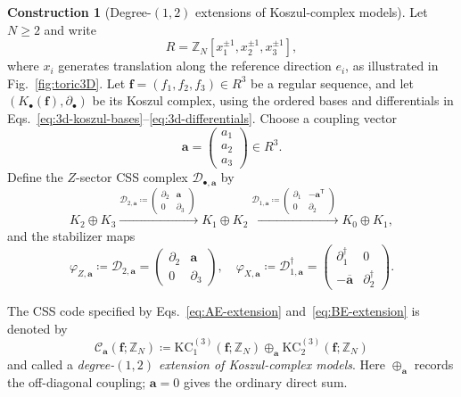 \documentclass[aps,prx,english,superscriptaddress,twocolumn,tightenlines,showpacs,longbibliography,floatfix,amsfonts]{revtex4-2}
\theoremstyle{remark}
\theoremstyle{definition}
\newtheorem{construction}{Construction}
\begin{document}
\begin{construction}[Degree-\((1,2)\) extensions of Koszul-complex models]
\label{constr:degree-12-koszul-extension}
\label{def:degree-12-koszul-extension}
Let \(N\geq2\) and write
\begin{equation}
	R=\mathbb Z_N[x_1^{\pm1},x_2^{\pm1},x_3^{\pm1}],
\end{equation}
where \(x_i\) generates translation along the reference direction \(e_i\),
as illustrated in Fig.~\ref{fig:toric3D}.
Let \(\mathbf f=(f_1,f_2,f_3)\in R^3\) be a regular sequence, and let
\((K_\bullet(\mathbf f),\partial_\bullet)\) be its Koszul complex, using the
ordered bases and differentials in
Eqs.~\eqref{eq:3d-koszul-bases}--\eqref{eq:3d-differentials}.  Choose a coupling vector
\begin{equation}
	\mathbf a=\begin{pmatrix}a_1\\a_2\\a_3\end{pmatrix}\in R^3.
\end{equation}
Define the \(Z\)-sector CSS complex \(\mathcal D_{\bullet,\mathbf a}\) by
\begin{equation}
	K_2 \oplus K_3
	\xrightarrow{\mathcal{D}_{2,\mathbf{a}} \coloneqq \begin{pmatrix} \partial_2 & \mathbf{a} \\ 0 & \partial_3 \end{pmatrix}\;}
	K_1 \oplus K_2
	\xrightarrow{\mathcal{D}_{1,\mathbf{a}} \coloneqq \begin{pmatrix} \partial_1 & -\mathbf{a}^{\mathsf{T}} \\ 0 & \partial_2 \end{pmatrix}\;}
	K_0 \oplus K_1,
	\label{eq:AE-extension}
\end{equation}
and the stabilizer maps
\begin{equation}
	\varphi_{Z,\mathbf a}
	\coloneqq \mathcal{D}_{2,\mathbf{a}}
	=
	\begin{pmatrix}
		\partial_2&\mathbf a\\
		0&\partial_3
	\end{pmatrix},
	\quad
	\varphi_{X,\mathbf a}
	\coloneqq \mathcal{D}_{1,\mathbf{a}}^\dagger
	=
	\begin{pmatrix}
		\partial_1^\dagger&0\\
		-\overline{\mathbf a}&\partial_2^\dagger
	\end{pmatrix}.
	\label{eq:BE-extension}
\end{equation}

	The CSS code specified by Eqs.~\eqref{eq:AE-extension}
	and~\eqref{eq:BE-extension} is denoted by
	\begin{equation}
		\mathcal C_{\mathbf a}(\mathbf f;\mathbb Z_N)
		\coloneqq
		\mathrm{KC}_1^{(3)}(\mathbf f;\mathbb Z_N)
		\mathbin{\oplus_{\mathbf a}}
		\mathrm{KC}_2^{(3)}(\mathbf f;\mathbb Z_N)
	\end{equation}
	and called a \emph{degree-\((1,2)\) extension of Koszul-complex models}.
	Here \(\oplus_{\mathbf a}\) records the off-diagonal coupling;
	\(\mathbf a=0\) gives the ordinary direct sum.
\end{construction}
\end{document}
